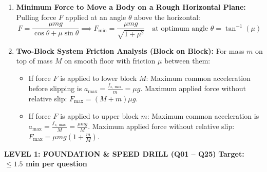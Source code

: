 \documentclass[11pt,a4paper]{article}
\begin{document}
\begin{enumerate}[label=(\alph*),leftmargin=14pt,itemsep=2.5pt]
\begin{itemize}[leftmargin=12pt,itemsep=1.5pt]
\[    \]
  \end{itemize}
  \item \textbf{Minimum Force to Move a Body on a Rough Horizontal Plane:}
  Pulling force $F$ applied at an angle $\theta$ above the horizontal:
  \[
    F = \frac{\mu mg}{\cos\theta + \mu\sin\theta} \implies F_{\min} = \frac{\mu mg}{\sqrt{1 + \mu^2}} \quad \text{at optimum angle } \theta = \tan^{-1}(\mu)
  \]
  \item \textbf{Two-Block System Friction Analysis (Block on Block):}
  For mass $m$ on top of mass $M$ on smooth floor with friction $\mu$ between them:
  \begin{itemize}[leftmargin=12pt,itemsep=1pt]
    \item If force $F$ is applied to lower block $M$: Maximum common acceleration before slipping is $a_{\max} = \frac{f_{s,\max}}{m} = \mu g$. Maximum applied force without relative slip: $F_{\max} = (M + m)\mu g$.
    \item If force $F$ is applied to upper block $m$: Maximum common acceleration is $a_{\max} = \frac{f_{s,\max}}{M} = \frac{\mu m g}{M}$. Maximum applied force without relative slip: $F_{\max} = \mu m g\left(1 + \frac{m}{M}\right)$.
  \end{itemize}
\end{enumerate}

\newpage


\begin{tcolorbox}[l1banner]
  {\large \textbf{\textsf{LEVEL 1: FOUNDATION \& SPEED DRILL (Q01 -- Q25)}}} \hfill {\small \textbf{Target: $\le 1.5$ min per question}}
\end{tcolorbox}
\vspace{4pt}
\end{document}
